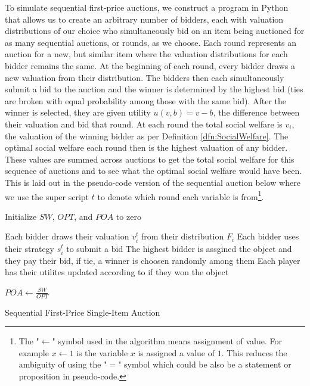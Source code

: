 \documentclass[12pt,twoside]{reedthesis}
\begin{document}
To simulate sequential first-price auctions, we construct a program in Python that allows us to create an arbitrary number of bidders, each with valuation distributions of our choice who simultaneously bid on an item being auctioned for as many sequential auctions, or rounds, as we choose. Each round represents an auction for a new, but similar item where the valuation distributions for each bidder remains the same. At the beginning of each round, every bidder draws a new valuation from their distribution. The bidders then each simultaneously submit a bid to the auction and the winner is determined by the highest bid (ties are broken with equal probability among those with the same bid). After the winner is selected, they are given utility $u(v, b) = v - b$, the difference between their valuation and bid that round. At each round the total social welfare is $v_i$, the valuation of the winning bidder as per Definition \ref{dfn:SocialWelfare}. The optimal social welfare each round then is the highest valuation of any bidder. These values are summed across auctions to get the total social welfare for this sequence of auctions and to see what the optimal social welfare would have been. This is laid out in the pseudo-code version of the sequential auction below where we use the super script $t$ to denote which round each variable is from\footnote{The "$\leftarrow$" symbol used in the algorithm means assignment of value. For example $x \leftarrow 1$ is the variable $x$ is assigned a value of $1$. This reduces the ambiguity of using the "$=$" symbol which could be also be a statement or proposition in pseudo-code.}.\\

\begin{algorithm}[H]
	Initialize $SW$, $OPT$, and $POA$ to zero\\
	{
		Each bidder draws their valuation $v^t_i$ from their distribution $F_i$\;
		Each bidder uses their strategy $s^t_i$ to submit a bid\;
		The highest bidder is assgined the object and they pay their bid, if tie, a winner is choosen randomly among them\;
		Each player has their utilites updated according to if they won the object\;
	
		$POA \leftarrow \frac{SW}{OPT}$	
	}
\caption{Sequential First-Price Single-Item Auction}
\label{alg:main}
\end{algorithm}
\end{document}
